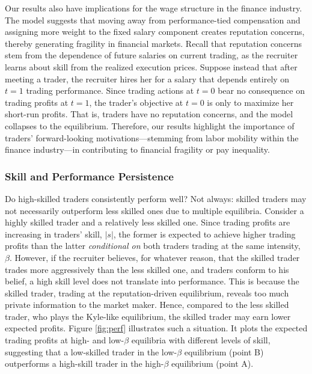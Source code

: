 
Our results also have implications for the wage structure in the finance industry. The model suggests that moving away from performance-tied compensation and assigning more weight to the fixed salary component creates reputation concerns, thereby generating fragility in financial markets. Recall that reputation concerns stem from the dependence of future salaries on current trading, as the recruiter learns about skill from the realized execution prices. Suppose instead that after meeting a trader, the recruiter hires her for a salary that depends entirely on  $t=1$ trading performance. Since trading actions at $t=0$ bear no consequence on trading profits at $t=1$, the trader's objective at $t=0$ is only to maximize her short-run profits. That is, traders have no reputation concerns, and the model collapses to the \citet{kyle1985continuous} equilibrium. Therefore, our results highlight the importance of traders' forward-looking motivations—stemming from labor mobility within the finance industry—in contributing to financial fragility or pay inequality.

\subsubsection{Skill and Performance Persistence}

Do high-skilled traders consistently perform well? Not always: skilled traders may not necessarily outperform less skilled ones due to multiple equilibria. Consider a highly skilled trader and a relatively less skilled one. Since trading profits are increasing in traders' skill, $|s|$, the former is expected to achieve higher trading profits than the latter \emph{conditional on} both traders trading at the same intensity, $\beta$. However, if the recruiter believes, for whatever reason, that the skilled trader trades more aggressively than the less skilled one, and traders conform to his belief, a high skill level does not translate into performance. This is because the skilled trader, trading at the reputation-driven equilibrium, reveals too much private information to the market maker. Hence, compared to the less skilled trader, who plays the Kyle-like equilibrium, the skilled trader may earn lower expected profits. Figure \ref{fig:perf}  illustrates such a situation. It plots the expected trading profits at high- and low-$\beta$ equilibria with different levels of skill, suggesting that a low-skilled trader in the low-$\beta$ equilibrium (point B) outperforms a high-skill trader in the high-$\beta$ equilibrium (point A).

